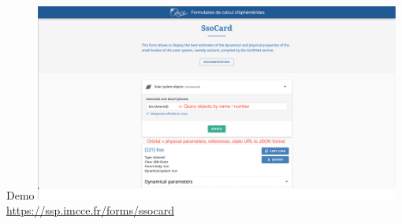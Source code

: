 \begin{frame}[t]{Demo}
  \includegraphics[width=0.9\textwidth]{gfx/demo_ssocard.png}
  \url{https://ssp.imcce.fr/forms/ssocard}
\end{frame}

